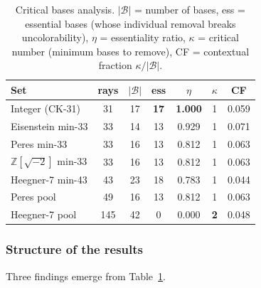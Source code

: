 \documentclass[12pt,a4paper]{article}
\newcommand{\Z}{\mathbb{Z}}
\begin{document}
\begin{table}[ht]
\centering
\caption{Critical bases analysis. $|\mathcal{B}|$ = number of bases, ess = essential bases (whose individual removal breaks uncolorability), $\eta$ = essentiality ratio, $\kappa$ = critical number (minimum bases to remove), CF = contextual fraction $\kappa/|\mathcal{B}|$.}
\label{tab:critical-bases}
\begin{tabular}{lcccccc}
\toprule
Set & rays & $|\mathcal{B}|$ & ess & $\eta$ & $\kappa$ & CF \\
\midrule
Integer (CK-31) & 31 & 17 & \textbf{17} & \textbf{1.000} & 1 & 0.059 \\
Eisenstein min-33 & 33 & 14 & 13 & 0.929 & 1 & 0.071 \\
Peres min-33 & 33 & 16 & 13 & 0.812 & 1 & 0.063 \\
$\Z[\sqrt{-2}]$ min-33 & 33 & 16 & 13 & 0.812 & 1 & 0.063 \\
Heegner-7 min-43 & 43 & 23 & 18 & 0.783 & 1 & 0.044 \\
\midrule
Peres pool & 49 & 16 & 13 & 0.812 & 1 & 0.063 \\
Heegner-7 pool & 145 & 42 & 0 & 0.000 & \textbf{2} & 0.048 \\
\bottomrule
\end{tabular}
\end{table}

\subsubsection{Structure of the results}

Three findings emerge from Table~\ref{tab:critical-bases}.
\end{document}
